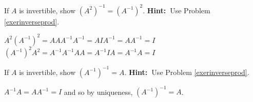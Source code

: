 \begin{enumialphparenastyle}
\begin{ex}If $A$ is invertible, show $\left( A^{2}\right) ^{-1}=\left(
A^{-1}\right) ^{2}.$ \textbf{Hint:\ }Use Problem \ref{exerinverseprod}. 
\begin{sol}
$A^{2}\left( A^{-1}\right) ^{2}=AAA^{-1}A^{-1}=AIA^{-1}=AA^{-1}=I$ $\left(
A^{-1}\right) ^{2}A^{2}=A^{-1}A^{-1}AA=A^{-1}IA=A^{-1}A=I$
\end{sol}
\end{ex}

\begin{ex}If $A$ is invertible, show $\left( A^{-1}\right) ^{-1}=A.$ 
\textbf{Hint:\ }Use Problem \ref{exerinverseprod}. 
\begin{sol}
 $A^{-1}A=AA^{-1}=I$ and so by
uniqueness, $\left( A^{-1}\right) ^{-1}=A$.
\end{sol}
\end{ex}

\end{enumialphparenastyle}
